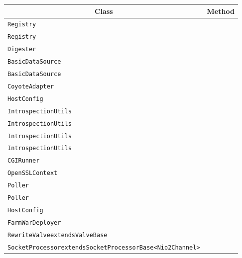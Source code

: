 \begin{center}
\begin{tabular}{ll}\toprule
\multicolumn{1}{c}{Class}&\multicolumn{1}{c}{Method}\\\midrule
\lstinline/Registry/&\raisebox{0pt}{\lstinline/ loadDescriptors(String,ClassLoader)/}\\ 
\lstinline/Registry/&\raisebox{0pt}{\lstinline/ loadDescriptors(String,ClassLoader)/}\\ 
\lstinline/Digester/&\raisebox{0pt}{\lstinline/ SAXExceptioncreateSAXException(String,Exception)/}\\ 
\lstinline/BasicDataSource/&\raisebox{0pt}{\lstinline/ ObjectNamepreRegister(MBeanServer,ObjectName)/}\\ 
\lstinline/BasicDataSource/&\raisebox{0pt}{\lstinline/ ObjectNamepreRegister(MBeanServer,ObjectName)/}\\ 
\lstinline/CoyoteAdapter/&\raisebox{0pt}{\lstinline/ convertURI(MessageBytes)/}\\ 
\lstinline/HostConfig/&\raisebox{0pt}{\lstinline/ checkUndeploy()/}\\ 
\lstinline/IntrospectionUtils/&\raisebox{0pt}{\lstinline/ ObjectgetProperty(Object,String)/}\\ 
\lstinline/IntrospectionUtils/&\raisebox{0pt}{\lstinline/ ObjectgetProperty(Object,String)/}\\ 
\lstinline/IntrospectionUtils/&\raisebox{0pt}{\lstinline/ ObjectgetProperty(Object,String)/}\\ 
\lstinline/IntrospectionUtils/&\raisebox{0pt}{\lstinline/ ObjectgetProperty(Object,String)/}\\ 
\lstinline/CGIRunner/&\raisebox{0pt}{\lstinline/ sendToLog(BufferedReaderrdr)/}\\ 
\lstinline/OpenSSLContext/&\raisebox{0pt}{\lstinline/ init(KeyManager[])/}\\ 
\lstinline/Poller/&\raisebox{0pt}{\lstinline/ timeout(int,boolean)/}\\ 
\lstinline/Poller/&\raisebox{0pt}{\lstinline/ timeout(int,boolean)/}\\ 
\lstinline/HostConfig/&\raisebox{0pt}{\lstinline/ checkUndeploy()/}\\ 
\lstinline/FarmWarDeployer/&\raisebox{0pt}{\lstinline/ copy(File,File)/}\\ 
\lstinline/RewriteValveextendsValveBase/&\raisebox{0pt}{\lstinline/ parse(BufferedReader)/}\\ 
\lstinline/SocketProcessorextendsSocketProcessorBase<Nio2Channel>/&\raisebox{0pt}{\lstinline/ doRun()/}\\ 

\end{tabular}
\end{center}

